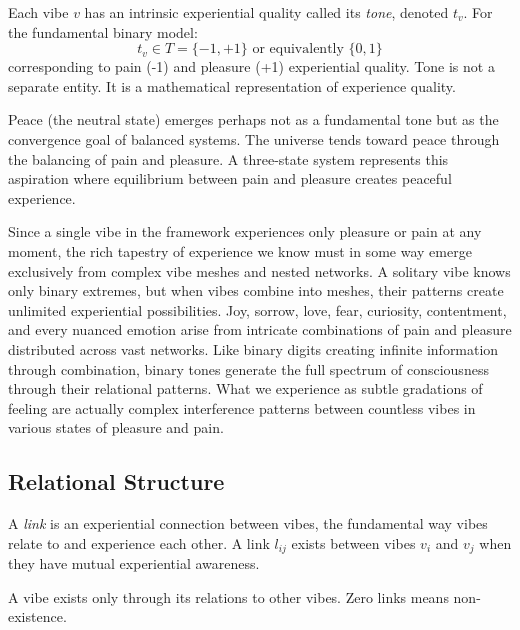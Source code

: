 \begin{definition}[Tone]
Each vibe $v$ has an intrinsic experiential quality called its \emph{tone}, denoted $t_v$. For the fundamental binary model:
\[
t_v \in T = \{-1, +1\} \text{ or equivalently } \{0, 1\}
\]
corresponding to pain (-1) and pleasure (+1) experiential quality. Tone is not a separate entity. It is a mathematical representation of experience quality.
\end{definition}

Peace (the neutral state) emerges perhaps not as a fundamental tone but as the convergence goal of balanced systems. The universe tends toward peace through the balancing of pain and pleasure. A three-state system represents this aspiration where equilibrium between pain and pleasure creates peaceful experience.

Since a single vibe in the framework experiences only pleasure or pain at any moment, the rich tapestry of experience we know must in some way emerge exclusively from complex vibe meshes and nested networks. A solitary vibe knows only binary extremes, but when vibes combine into meshes, their patterns create unlimited experiential possibilities. Joy, sorrow, love, fear, curiosity, contentment, and every nuanced emotion arise from intricate combinations of pain and pleasure distributed across vast networks. Like binary digits creating infinite information through combination, binary tones generate the full spectrum of consciousness through their relational patterns. What we experience as subtle gradations of feeling are actually complex interference patterns between countless vibes in various states of pleasure and pain.

\subsection{Relational Structure}

\begin{definition}[Link]
A \emph{link} is an experiential connection between vibes, the fundamental way vibes relate to and experience each other. A link $l_{ij}$ exists between vibes $v_i$ and $v_j$ when they have mutual experiential awareness.
\end{definition}

\begin{axiom}[Relationality]
A vibe exists only through its relations to other vibes. Zero links means non-existence.
\end{axiom}

